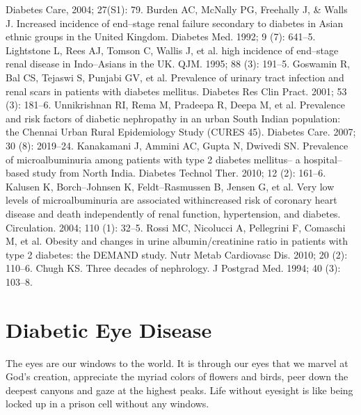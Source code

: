 \begin{thebibliography}{99}
 Diabetes Care, 2004; 27(S1): 79.
 Burden AC, McNally PG, Freehally J, \& Walls J. Increased incidence of end–stage renal failure secondary to diabetes in Asian ethnic groups in the United Kingdom. Diabetes Med. 1992; 9 (7): 641–5.
 Lightstone L, Rees AJ, Tomson C, Wallis J, et al. high incidence of end–stage renal disease in Indo–Asians in the UK. QJM. 1995; 88 (3): 191–5.
 Goswamin R, Bal CS, Tejaswi S, Punjabi GV, et al. Prevalence of urinary tract infection and renal scars in patients with diabetes mellitus. Diabetes Res Clin Pract. 2001; 53 (3): 181–6.
 Unnikrishnan RI, Rema M, Pradeepa R, Deepa M, et al. Prevalence and risk factors of diabetic nephropathy in an urban South Indian population: the Chennai Urban Rural Epidemiology Study (CURES 45). Diabetes Care. 2007; 30 (8): 2019–24.
 Kanakamani J, Ammini AC, Gupta N, Dwivedi SN. Prevalence of microalbuminuria among patients with type 2 diabetes mellitus– a hospital–based study from North India. Diabetes Technol Ther. 2010; 12 (2): 161–6.
 Kalusen K, Borch–Johnsen K, Feldt–Rasmussen B, Jensen G, et al. Very low levels of microalbuminuria are associated with\break increased risk of coronary heart disease and death independently of renal function, hypertension, and diabetes. Circulation. 2004; 110 (1): 32–5.
 Rossi MC, Nicolucci A, Pellegrini F, Comaschi M, et al. Obesity and changes in urine albumin/creatinine ratio in patients with type 2 diabetes: the DEMAND study. Nutr Metab Cardiovasc Dis. 2010; 20 (2): 110–6.
 Chugh KS. Three decades of nephrology. J Postgrad Med. 1994; 40 (3): 103–8.
\end{thebibliography}

\newpage

\renewcommand{\thechapter}{\arabic{chapter}}
\chapter{Diabetic Eye Disease}\label{chap15}

The eyes are our windows to the world. It is through our eyes that we marvel at God’s creation, appreciate the myriad colors of flowers and birds, peer down the deepest canyons and gaze at the highest peaks. Life without eyesight is like being locked up in a prison cell without any windows.

